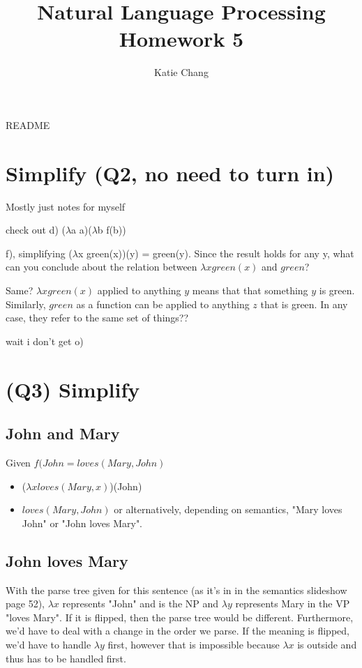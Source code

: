 \documentclass[12pt, letterpaper]{article}
\title{Natural Language Processing Homework 5}
\author{Katie Chang}
\begin{document}
\maketitle

README

\section{Simplify (Q2, no need to turn in)}
Mostly just notes for myself

check out d) ($\lambda$a a)($\lambda$b f(b))

f), simplifying ($\lambda$x green(x))(y) = green(y).
Since the result holds for any y, what can you conclude about the relation between $\lambda x green(x)$ and $green$?

Same? $\lambda x green(x)$ applied to anything $y$ means that that something $y$ is green. Similarly, $green$ as a function can be applied to anything $z$ that is green. In any case, they refer to the same set of things??

wait i don't get o)

\section{(Q3) Simplify}

\subsection{John and Mary}
Given $f(John = loves(Mary, John)$

\begin{itemize}  
\item ($\lambda x loves(Mary,x)$)(John)
\item $loves(Mary, John)$ or alternatively, depending on semantics, "Mary loves John" or "John loves Mary".
\end{itemize}

\subsection{John loves Mary}

With the parse tree given for this sentence (as it's in in the semantics slideshow page 52), $\lambda x$ represents "John" and is the NP and $\lambda y$ represents Mary in the VP "loves Mary". If it is flipped, then the parse tree would be different. Furthermore, we'd have to deal with a change in the order we parse. If the meaning is flipped, we'd have to handle $\lambda y$ first, however that is impossible because $\lambda x$ is outside and thus has to be handled first.
\end{document}
